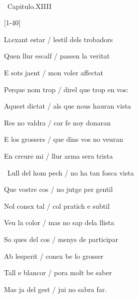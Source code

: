 \documentclass[12pt]{article}
\renewcommand{\espaiAbansEtiquetaPoema}{\vspace{0ex}}
\begin{document}
\begin{estrofa}

\espaiAbansEtiquetaPoema

\\

\begin{rubrica}

\pagina{[25r]} \textparagraph\  Capitulo.XIIII

\end{rubrica}

\begin{Versos}

[1-40]

\end{Versos}

\end{estrofa}


\begin{estrofa}

 L\textsc{l}exant estar / lestil dels trobadors

 Quen llur escalf / passen la veritat

 E sots jaent / mon voler affectat

 Perque nom trop / direl que trop en vos:

 Aquest dictat / als que nous hauran vista

 Res no valdra / car fe noy donaran

 E los grossers / que dins vos no veuran

 En creure mi / llur arma sera trista

\end{estrofa}



\begin{estrofa}

 \textparagraph\  Lull del hom pech / no ha tan fosca vista

 Que vostre cos / no jutge per gentil

 Nol conex tal / col pratich e subtil

 Veu la color / mas no sap dela llista

 So ques del cos / menys de participar

 Ab lesperit / conex be lo grosser

 Tall e blancor / pora molt be saber

 Mas ja del gest / jui no sabra far.

\end{estrofa}
\end{document}
